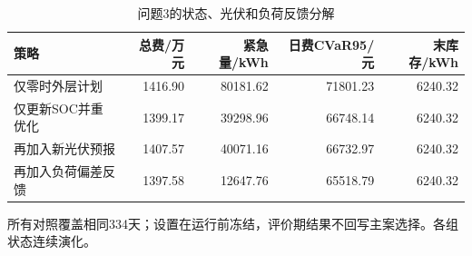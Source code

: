 \begin{table}[htbp]\centering\small
\caption{问题3的状态、光伏和负荷反馈分解}
\label{tab:v2_feedback}
\begin{tabularx}{\linewidth}{LRRRR}\toprule
策略 & 总费/万元 & 紧急量/kWh & 日费CVaR95/元 & 末库存/kWh\\\midrule
仅零时外层计划 & 1416.90 & 80181.62 & 71801.23 & 6240.32\\
仅更新SOC并重优化 & 1399.17 & 39298.96 & 66748.14 & 6240.32\\
再加入新光伏预报 & 1407.57 & 40071.16 & 66732.97 & 6240.32\\
再加入负荷偏差反馈 & 1397.58 & 12647.76 & 65518.79 & 6240.32\\
\bottomrule\end{tabularx}
\par\smallskip\parbox{\linewidth}{\footnotesize 所有对照覆盖相同334天；设置在运行前冻结，评价期结果不回写主案选择。各组状态连续演化。}
\end{table}